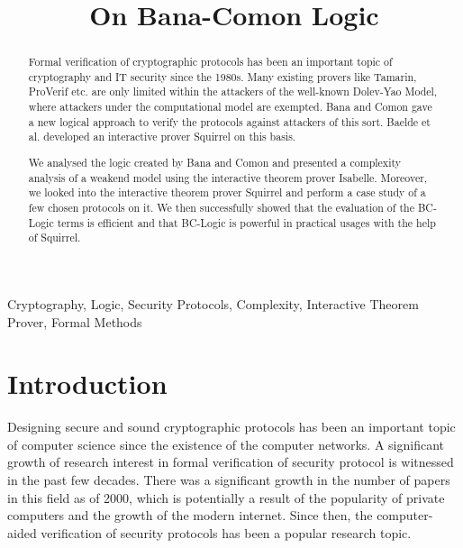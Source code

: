 \documentclass[conference]{IEEEtran}
\begin{document}
\title{On Bana-Comon Logic}

\author{
}

\maketitle

\begin{abstract}
Formal verification of cryptographic protocols has been an important topic of cryptography and IT security since the 1980s. Many existing provers like Tamarin, ProVerif etc. are only limited within the attackers of the well-known Dolev-Yao Model, where attackers under the computational model are exempted. Bana and Comon gave a new logical approach to verify the protocols against attackers of this sort. Baelde et al. developed an interactive prover Squirrel on this basis.

We analysed the logic created by Bana and Comon and presented a complexity analysis of a weakend model using the interactive theorem prover Isabelle. Moreover, we looked into the interactive theorem prover Squirrel and perform a case study of a few chosen protocols on it. We then successfully showed that the evaluation of the BC-Logic terms is efficient and that BC-Logic is powerful in practical usages with the help of Squirrel.
\end{abstract}

\begin{IEEEkeywords}
Cryptography, Logic, Security Protocols, Complexity, Interactive Theorem Prover, Formal Methods
\end{IEEEkeywords}

\section{Introduction}
Designing secure and sound cryptographic protocols has been an important topic of computer science since the existence of the computer networks. A significant growth of research interest in formal verification of security protocol is witnessed in the past few decades. There was a significant growth in the number of papers in this field as of 2000, which is potentially a result of the popularity of private computers and the growth of the modern internet. Since then, the computer-aided verification of security protocols has been a popular research topic.\cite{SOK2}
\end{document}
